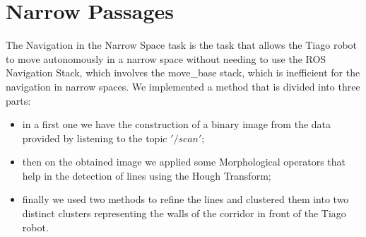 \section{Narrow Passages}
The Navigation in the Narrow Space task is the task that allows the Tiago robot to move autonomously in a narrow space without needing to use the ROS Navigation Stack, which involves the move\_base stack, which is inefficient for the navigation in narrow spaces. We implemented a method that is divided into three parts:
\begin{itemize}
    \item in a first one we have the construction of a binary image from the data provided by listening to the topic \('/scan'\);
    \item then on the obtained image we applied some Morphological operators that help in the detection of lines using the Hough Transform;
    \item finally we used two methods to refine the lines and clustered them into two distinct clusters representing the walls of the corridor in front of the Tiago robot.
\end{itemize}
